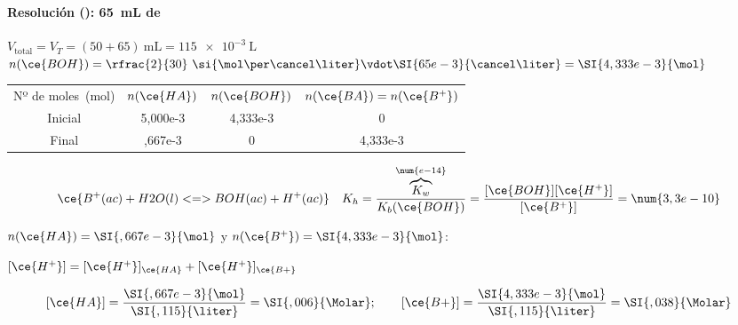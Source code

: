 \begin{frame}
	\frametitle{\ejerciciocmd}
	\framesubtitle{Resolución (): \SI{65}{\milli\liter} de }
	 $V_{\text{total}}=V_T=(50+65)~\si{\milli\liter}=\SI{115e-3}{\liter}$
	 $n(\ce{BOH})=\rfrac{2}{30}~\si{\mol\per\cancel\liter}\vdot\SI{65e-3}{\cancel\liter}=\SI{4,333e-3}{\mol}$
	 
	\begin{center}
		{\small \begin{tabular}{cSSS}
			\toprule
				Nº de moles~(\si{\mol})	& {$n(\ce{HA})$}	& {$n(\ce{BOH})$}		& {$n(\ce{BA})=n(\ce{B^+})$}	\\
				Inicial					& 5,000e-3			& 4,333e-3				& 0								\\
				Final					&  ,667e-3 			& 0						& 4,333e-3						\\
			\bottomrule
		\end{tabular}}
	\end{center}
	\begin{center}
		$$
			\ce{B^+(ac) + H2O(l) <=> BOH(ac) + H^+(ac)}\quad K_h=\frac{\overbrace{K_w}^{\num{e-14}}}{K_b(\ce{BOH})}=\frac{[\ce{BOH}][\ce{H^+}]}{[\ce{B^+}]}=\num{3,3e-10}
		$$
	\end{center}
	 $n(\ce{HA})=\SI{,667e-3}{\mol}$ y $n(\ce{B^+})=\SI{4,333e-3}{\mol}$:\quad
	\begin{center}
		\underline{$[\ce{H^+}] = [\ce{H^+}]_{\ce{HA}} + [\ce{H^+}]_{\ce{B+}}$}
	\end{center}
	$$
		[\ce{HA}] = \frac{\SI{,667e-3}{\mol}}{\SI{,115}{\liter}} = \SI{,006}{\Molar};\quad\quad[\ce{B+}] = \frac{\SI{4,333e-3}{\mol}}{\SI{,115}{\liter}} = \SI{,038}{\Molar}
	$$
\end{frame}

